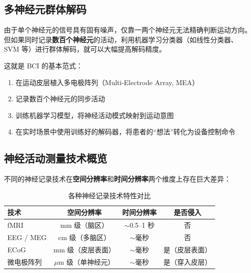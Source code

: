 \documentclass[a4paper]{article}
\begin{document}
\subsection{多神经元群体解码}




由于单个神经元的信号具有固有噪声，仅靠一两个神经元无法精确判断运动方向。但如果同时记录\textbf{数百个神经元}的活动，利用机器学习分类器（如线性分类器、SVM 等）进行群体解码，就可以大幅提高解码精度。

这就是 BCI 的基本范式：
\begin{enumerate}
    \item 在运动皮层植入多电极阵列（Multi-Electrode Array, MEA）
    \item 记录数百个神经元的同步活动
    \item 训练机器学习模型，将神经活动模式映射到运动意图
    \item 在实时场景中使用训练好的解码器，将患者的``想法''转化为设备控制命令
\end{enumerate}

\subsection{神经活动测量技术概览}




不同的神经记录技术在\textbf{空间分辨率}和\textbf{时间分辨率}两个维度上存在巨大差异：

\begin{table}[H]
\centering
\begin{tabular}{lccc}
\toprule
\textbf{技术} & \textbf{空间分辨率} & \textbf{时间分辨率} & \textbf{是否侵入} \\
\midrule
fMRI & mm 级（脑区） & $\sim$0.5--1 秒 & 否 \\
EEG / MEG & cm 级（多脑区） & $\sim$毫秒 & 否 \\
ECoG & mm 级（皮层表面） & $\sim$毫秒 & 是（皮层表面） \\
微电极阵列 & $\mu$m 级（单神经元） & $\sim$毫秒 & 是（穿入皮层） \\
\bottomrule
\end{tabular}
\caption{各种神经记录技术特性对比}
\end{table}
\end{document}
